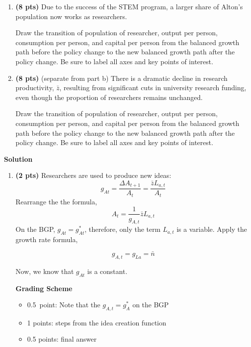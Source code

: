 \documentclass[14pt, oneside]{memoir}
\begin{document}
{{{\begin{enumerate}[label=\textbf{\arabic*.}, itemsep=15pt]
\begin{enumerate}[label=(\alph*)]
	
	\item \textbf{(8 pts)} Due to the success of the STEM program, a larger share of Alton's population now works as researchers.  
	
	Draw the transition of population of researcher, output per person, consumption per person, and capital per person from the balanced growth path before the policy change to the new balanced growth path after the policy change. Be sure to label all axes and key points of interest.
	
	
	\item \textbf{(8 pts)} (separate from part b)  There is a dramatic decline in research productivity, \(\bar{z}\), resulting from significant cuts in university research funding, even though the proportion of researchers remains unchanged.
	
	Draw the transition of population of researcher, output per person, consumption per person, and capital per person from the balanced growth path before the policy change to the new balanced growth path after the policy change. Be sure to label all axes and key points of interest.
	
	
\end{enumerate}
\clearpage

\textbf{Solution}
\begin{enumerate}[label=(\alph*)]
	\item \textbf{(2 pts)} Researchers are used to produce new ideas:
	\[g_{At} = \frac{\Delta A_{t+1}}{A_t} =\frac{\bar{z}L_{a,t}}{A_t} \]
	Rearrange the the formula,
	\[A_t = \frac{1}{g_{A,t}} \bar{z} L_{a,t}\]
	On  the BGP, $g_{At} = g^*_{At}$, therefore, only the term $L_{a,t}$ is a variable. Apply the growth rate formula,
	
	\[g_{A,t} = g_{La} = \bar{n}\]
	
	Now, we know that $g_{At}$ is a constant.
	
	\textbf{Grading Scheme}
	
	\begin{itemize}
		\item 0.5 point: Note that the $g_{A,t} = g_A^*$ on the BGP
		\item 1 points: steps from the idea creation function
		\item 0.5 points: final answer
	\end{itemize}
	

\end{enumerate}
\end{enumerate}}}}
\end{document}
